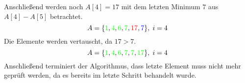 \noindent
Anschließend werden noch $A[4] = 17$ mit dem letzten Minimum $7$ aus $A[4] - A[5]$ betrachtet.
\begin{equation*}
	A = \{\textcolor{green}{1}, \textcolor{green}{4}, \textcolor{green}{6},\textcolor{green}{7}, \textcolor{red}{17}, \textcolor{blue}{7}\},\;i = 4 \\
\end{equation*}
\noindent
Die Elemente werden vertauscht, da $17 > 7$.
\begin{equation*}
	A = \{\textcolor{green}{1}, \textcolor{green}{4}, \textcolor{green}{6},\textcolor{green}{7}, \textcolor{green}{7}, \textcolor{green}{17}\},\;i = 4 \\
\end{equation*}
\noindent
Anschließend terminiert der Algorithmus, dass letzte Element muss nicht mehr geprüft werden, da es bereits im letzte Schritt behandelt wurde. 

\newpage



